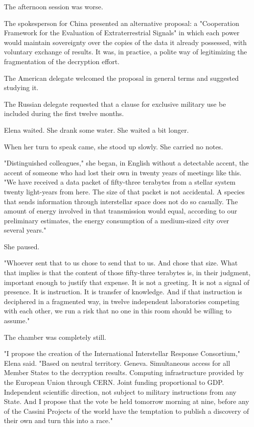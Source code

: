 \documentclass[11pt,a5paper,twoside]{book}
\begin{document}
The afternoon session was worse.

The spokesperson for China presented an alternative proposal: a "Cooperation Framework for the Evaluation of Extraterrestrial Signals" in which each power would maintain sovereignty over the copies of the data it already possessed, with voluntary exchange of results. It was, in practice, a polite way of legitimizing the fragmentation of the decryption effort.

The American delegate welcomed the proposal in general terms and suggested studying it.

The Russian delegate requested that a clause for exclusive military use be included during the first twelve months.

Elena waited. She drank some water. She waited a bit longer.

When her turn to speak came, she stood up slowly. She carried no notes.

"Distinguished colleagues," she began, in English without a detectable accent, the accent of someone who had lost their own in twenty years of meetings like this. "We have received a data packet of fifty-three terabytes from a stellar system twenty light-years from here. The size of that packet is not accidental. A species that sends information through interstellar space does not do so casually. The amount of energy involved in that transmission would equal, according to our preliminary estimates, the energy consumption of a medium-sized city over several years."

She paused.

"Whoever sent that to us chose to send that to us. And chose that size. What that implies is that the content of those fifty-three terabytes is, in their judgment, important enough to justify that expense. It is not a greeting. It is not a signal of presence. It is instruction. It is transfer of knowledge. And if that instruction is deciphered in a fragmented way, in twelve independent laboratories competing with each other, we run a risk that no one in this room should be willing to assume."

The chamber was completely still.

"I propose the creation of the International Interstellar Response Consortium," Elena said. "Based on neutral territory. Geneva. Simultaneous access for all Member States to the decryption results. Computing infrastructure provided by the European Union through CERN. Joint funding proportional to GDP. Independent scientific direction, not subject to military instructions from any State. And I propose that the vote be held tomorrow morning at nine, before any of the Cassini Projects of the world have the temptation to publish a discovery of their own and turn this into a race."
\end{document}
